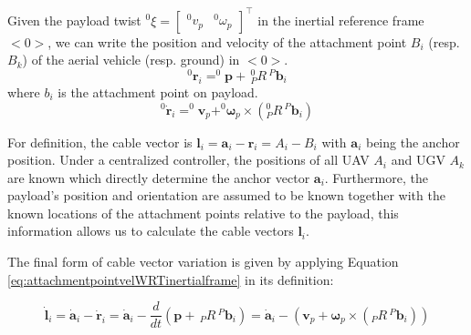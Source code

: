 Given the payload twist $^0\xi = \begin{bmatrix}
    ^0v_p & ^0\omega_p
\end{bmatrix}^\top$ in the inertial reference frame $<0>$, we can write the position and velocity of the attachment point $B_i$ (resp. $B_k$) of the aerial vehicle (resp. ground) in $<0>$.
\begin{equation}
    ^0\boldsymbol{r}_i = ^0\boldsymbol{p} + \, ^0_PR \, ^P\boldsymbol{b}_i
\end{equation}
where $b_i$ is the attachment point on payload.
\begin{equation}
    ^0\dot{\boldsymbol{r}}_i = ^0\boldsymbol{v}_p + ^0\boldsymbol{\omega}_p \times \left( ^0_PR \, ^P\boldsymbol{b}_i \right)
    \label{eq:attachmentpointvelWRTinertialframe}
\end{equation}

For definition, the cable vector is $\boldsymbol{l}_i = \boldsymbol{a}_i - \boldsymbol{r}_i = A_i - B_i$ with $\boldsymbol{a}_i$ being the anchor position. 
Under a centralized controller, the positions of all UAV $A_i$ and UGV $A_k$ are known which directly determine the anchor vector $\boldsymbol{a}_i$. Furthermore, the payload's position and orientation are assumed to be known together with the known locations of the attachment points relative to the payload, this information allows us to calculate the cable vectors $\boldsymbol{l}_i$.

The final form of cable vector variation is given by applying Equation \ref{eq:attachmentpointvelWRTinertialframe} in its definition:

\begin{equation}
    \dot{\boldsymbol{l}}_i = \dot{\boldsymbol{a}}_i - \dot{\boldsymbol{r}}_i = \dot{\boldsymbol{a}}_i - \frac{d}{dt}\left(\boldsymbol{p} + \, _PR \, ^P\boldsymbol{b}_i \right) =\dot{\boldsymbol{a}}_i - \left(\boldsymbol{v}_p + \boldsymbol{\omega}_p \times \left( _PR \, ^P\boldsymbol{b}_i \right)\right)
\end{equation}


